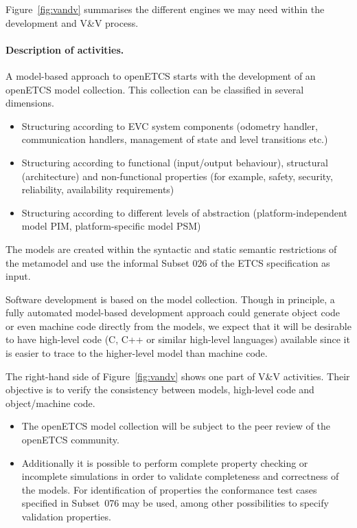 \documentclass[11pt, a4paper]{article}
\begin{document}
Figure~\ref{fig:vandv} summarises the different engines we may need within
the development and V\&V process. 
\paragraph{Description of activities.}
A model-based approach to openETCS starts with the development of an openETCS 
model collection. This collection can be classified in several dimensions.
\begin{itemize}
\item Structuring according to EVC system components (odometry handler, communication handlers, management of state and level transitions etc.)
\item Structuring according to functional (input/output behaviour), structural (architecture)  and non-functional properties (for example, safety, security, reliability, availability  requirements)
\item Structuring according to different levels of abstraction (platform-independent model PIM, platform-specific model PSM)
\end{itemize}
The models are created within the syntactic and static semantic restrictions of the metamodel and
use   the informal Subset 026 of the ETCS specification as input.

Software development is based on the model collection. Though in principle, a fully automated model-based development approach could generate object code or even 
machine code directly from the models, we expect that it will be desirable to have high-level code (C, C++ or similar high-level languages) available since it is
easier to trace to the higher-level model than machine code. 

The right-hand side of Figure~\ref{fig:vandv} shows one part of V\&V activities. Their objective is to 
verify the consistency between models, high-level code and object/machine code.
\begin{itemize}
\item The openETCS model collection will be subject to the peer review of the openETCS community.

\item 
Additionally it is possible to perform complete property checking or incomplete simulations in order
to validate completeness and correctness of the models. For identification of properties the
conformance test cases specified in Subset~076 may be used, among other possibilities to specify validation properties.

\end{itemize}
\end{document}
